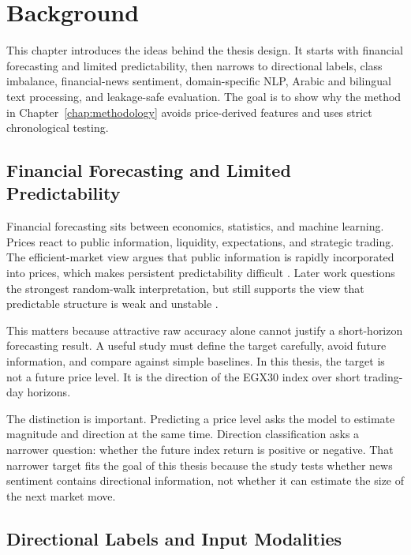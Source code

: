 \chapter{Background}
\label{chap:background}

This chapter introduces the ideas behind the thesis design. It starts with financial forecasting and limited predictability, then narrows to directional labels, class imbalance, financial-news sentiment, domain-specific NLP, Arabic and bilingual text processing, and leakage-safe evaluation. The goal is to show why the method in Chapter~\ref{chap:methodology} avoids price-derived features and uses strict chronological testing.

\section{Financial Forecasting and Limited Predictability}

Financial forecasting sits between economics, statistics, and machine learning. Prices react to public information, liquidity, expectations, and strategic trading. The efficient-market view argues that public information is rapidly incorporated into prices, which makes persistent predictability difficult \cite{fama1970}. Later work questions the strongest random-walk interpretation, but still supports the view that predictable structure is weak and unstable \cite{lo1988randomwalk}.

This matters because attractive raw accuracy alone cannot justify a short-horizon forecasting result. A useful study must define the target carefully, avoid future information, and compare against simple baselines. In this thesis, the target is not a future price level. It is the direction of the EGX30 index over short trading-day horizons.

The distinction is important. Predicting a price level asks the model to estimate magnitude and direction at the same time. Direction classification asks a narrower question: whether the future index return is positive or negative. That narrower target fits the goal of this thesis because the study tests whether news sentiment contains directional information, not whether it can estimate the size of the next market move.

\section{Directional Labels and Input Modalities}

